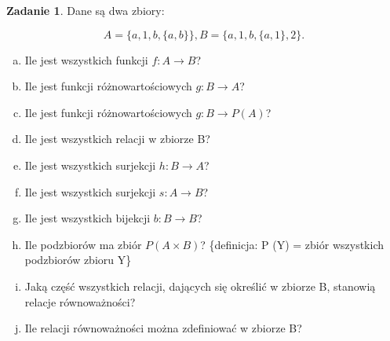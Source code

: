 \documentclass[11pt]{article}
\theoremstyle{definition}
\newtheorem{zadanie}{Zadanie}
\numberwithin{zadanie}{subsection}
\begin{document}
\begin{zadanie}
    Dane są dwa zbiory:

    $$A = \{a,1,b,\{a,b\}\}, B = \{a,1,b,\{a,1\},2\}.$$

    \begin{enumerate}[a)]
        \item Ile jest wszystkich funkcji $f: A \to B$?
        \item Ile jest funkcji różnowartościowych $g: B \to A$?
        \item Ile jest funkcji różnowartościowych $g: B \to P(A)$?
        \item Ile jest wszystkich relacji w zbiorze B?
        \item Ile jest wszystkich surjekcji $h: B \to A$?
        \item Ile jest wszystkich surjekcji $s: A \to B$?
        \item Ile jest wszystkich bijekcji $b: B\to B$?
        \item Ile podzbiorów ma zbiór $P (A\times B)$? \{definicja: P (Y) = zbiór wszystkich podzbiorów zbioru Y\}
        \item Jaką część wszystkich relacji, dających się określić w zbiorze B, stanowią relacje równoważności?
        \item Ile relacji równoważności można zdefiniować w zbiorze B?
    \end{enumerate}
\end{zadanie}
\end{document}
